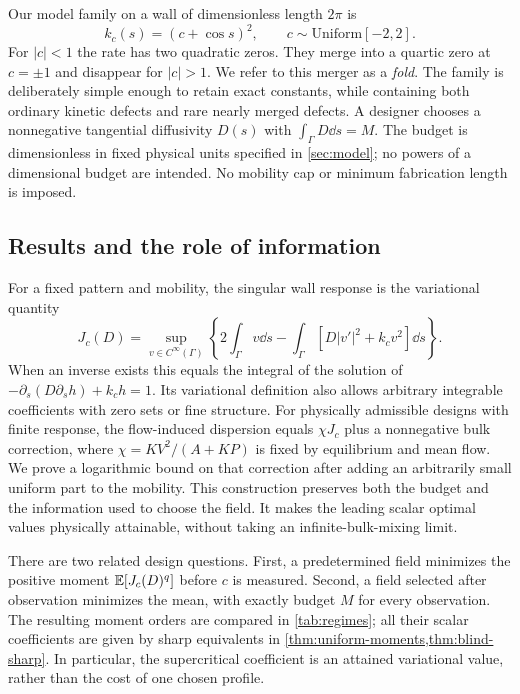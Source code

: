 Our model family on a wall of dimensionless length $2\pi$ is
\[
       k_c(s)=(c+\cos s)^2,\qquad c\sim\mathrm{Uniform}[-2,2].
\]
For $|c|<1$ the rate has two quadratic zeros. They merge into a
quartic zero at $c=\pm1$ and disappear for $|c|>1$.
We refer to this merger as a \emph{fold}. The family is deliberately
simple enough to retain exact constants, while containing both ordinary
kinetic defects and rare nearly merged defects. A designer chooses a
nonnegative tangential diffusivity $D(s)$ with
$\int_\Gamma D\dd s=M$. The budget is dimensionless in fixed physical
units specified in \cref{sec:model}; no powers of a dimensional budget
are intended. No mobility cap or minimum fabrication length is imposed.

\subsection{Results and the role of information}
For a fixed pattern and mobility, the singular wall response is the
variational quantity
\begin{equation}\label{eq:intro-response}
 J_c(D)=\sup_{v\in C^\infty(\Gamma)}
 \left\{2\int_\Gamma v\dd s
      -\int_\Gamma[D|v'|^2+k_cv^2]\dd s\right\}.
\end{equation}
When an inverse exists this equals the integral of the solution of
$-\partial_s(D\partial_sh)+k_ch=1$. Its variational definition also
allows arbitrary integrable coefficients with zero sets or fine structure.
For physically admissible designs with finite response, the
flow-induced dispersion equals $\chi J_c$ plus a nonnegative bulk
correction, where $\chi=KV^2/(A+KP)$ is fixed by equilibrium and
mean flow. We prove a logarithmic bound on that correction after adding
an arbitrarily small uniform part to the mobility. This construction
preserves both the budget and the information used to choose the field.
It makes the leading scalar optimal values physically attainable,
without taking an infinite-bulk-mixing limit.

There are two related design questions. First, a predetermined field
minimizes the positive moment $\mathbb E[J_c(D)^q]$ before $c$ is measured.
Second, a field selected after observation minimizes the mean, with
exactly budget $M$ for every observation. The resulting moment orders
are compared in \cref{tab:regimes}; all their scalar coefficients are
given by sharp equivalents in \cref{thm:uniform-moments,thm:blind-sharp}.
In particular, the supercritical coefficient is an attained variational
value, rather than the cost of one chosen profile.

